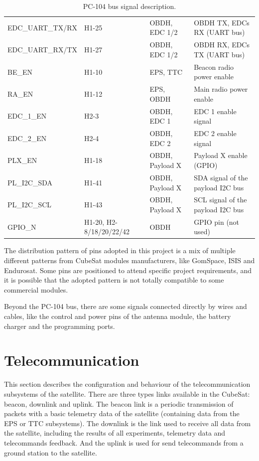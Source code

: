 \begin{table}[!h]
\begin{tabular}{lL{0.18\textwidth}L{0.17\textwidth}L{0.33\textwidth}}
        EDC\_UART\_TX/RX & H1-25           & OBDH, EDC 1/2        & OBDH TX, EDCs RX (UART bus) \\
        EDC\_UART\_RX/TX & H1-27           & OBDH, EDC 1/2        & OBDH RX, EDCs TX (UART bus) \\
        BE\_EN           & H1-10           & EPS, TTC             & Beacon radio power enable \\
        RA\_EN           & H1-12           & EPS, OBDH            & Main radio power enable \\
        EDC\_1\_EN       & H2-3            & OBDH, EDC 1          & EDC 1 enable signal \\
        EDC\_2\_EN       & H2-4            & OBDH, EDC 2          & EDC 2 enable signal \\
        PLX\_EN          & H1-18           & OBDH, Payload X      & Payload X enable (GPIO) \\
        PL\_I2C\_SDA     & H1-41           & OBDH, Payload X      & SDA signal of the payload I2C bus \\
        PL\_I2C\_SCL     & H1-43           & OBDH, Payload X      & SCL signal of the payload I2C bus \\
        GPIO\_N          & H1-20, H2-8/18/20/22/42  & OBDH        & GPIO pin (not used) \\
        \bottomrule[1.5pt]
    \end{tabular}
    \caption{PC-104 bus signal description.}
    \label{tab:pc104-signals}
\end{table}

The distribution pattern of pins adopted in this project is a mix of multiple different patterns from CubeSat modules manufacturers, like GomSpace, ISIS and Endurosat. Some pins are positioned to attend specific project requirements, and it is possible that the adopted pattern is not totally compatible to some commercial modules.

Beyond the PC-104 bus, there are some signals connected directly by wires and cables, like the control and power pins of the antenna module, the battery charger and the programming ports.

\section{Telecommunication}

This section describes the configuration and behaviour of the telecommunication subsystems of the satellite. There are three types links available in the CubeSat: beacon, downlink and uplink. The beacon link is a periodic transmission of packets with a basic telemetry data of the satellite (containing data from the EPS or TTC subsystems). The downlink is the link used to receive all data from the satellite, including the results of all experiments, telemetry data and telecommands feedback. And the uplink is used for send telecommands from a ground station to the satellite.

